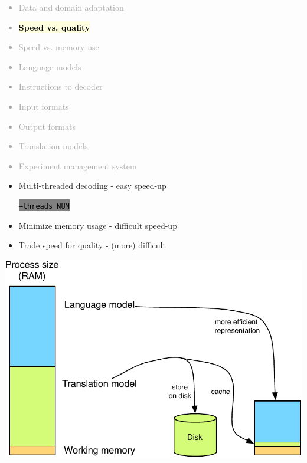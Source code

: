 \documentclass[landscape]{uedslides2C}
\newcommand{\currenttopic}[1]{\colorbox{lightyellow}{\textcolor{black}{\bf #1}}}
\newcommand{\littlecode}[1]{\colorbox{gray}{\textcolor{black}{\small \tt #1}}}
\begin{document}

\vspace{-5mm}
\textcolor{darkgrey}{
\begin{itemize} \itemsep -1mm
\item Data and domain adaptation
\item \currenttopic{Speed vs. quality}
\item Speed vs. memory use
\item Language models
\item Instructions to decoder
\item Input formats
\item Output formats
\item Translation models
\item Experiment management system
\end{itemize}
}



\vspace{15mm}
\begin{itemize}
\item Multi-threaded decoding - easy speed-up
\begin{center}
\littlecode{--threads NUM}
\end{center}

\item Minimize memory usage - difficult speed-up

\item Trade speed for quality - (more) difficult

\end{itemize}


\begin{center} 
\includegraphics[scale=1.4]{less-memory.pdf}
\end{center}
\end{document}
